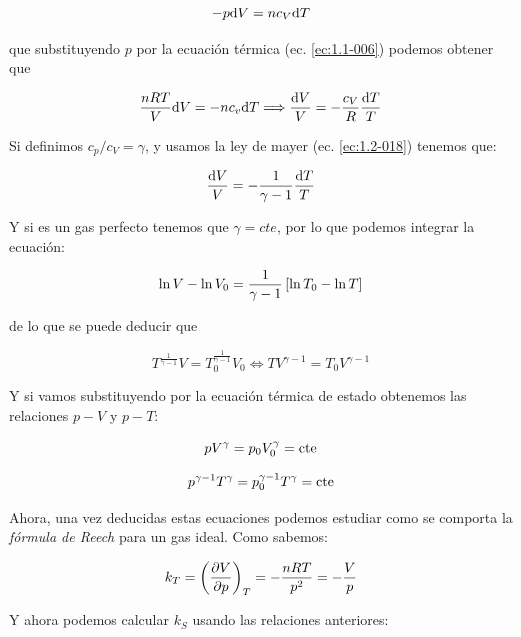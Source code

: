 \documentclass[12pt,a4paper]{article}
\begin{document}
\begin{equation}
- p \mathrm{d} V = n c_V \mathrm{d} T
\end{equation}

que substituyendo $p$ por la ecuación térmica (ec. \ref{ec:1.1-006}) podemos obtener que

\begin{equation}
\dfrac{nRT}{V} \mathrm{d} V = - n c_v  \mathrm{d} T \Longrightarrow \dfrac{\mathrm{d} V}{V} = - \dfrac{c_V}{R} \dfrac{\mathrm{d} T}{T}
\end{equation}

Si definimos $c_p/c_V = \gamma$, y usamos la ley de mayer (ec. \ref{ec:1.2-018}) tenemos que:

\begin{equation}
\dfrac{\mathrm{d} V}{V} = - \dfrac{1}{\gamma -1} \dfrac{\mathrm{d} T}{T}
\end{equation}

Y si es un gas perfecto tenemos que $\gamma = cte$, por lo que podemos integrar la ecuación:

\begin{equation}
\ln V - \ln V_0 = \dfrac{1}{\gamma - 1} \left[ \ln T_0 - \ln T \right]
\end{equation}


de lo que se puede deducir que

\begin{equation}
T^{\frac{1}{\gamma -1}} V = T_0^{\frac{1}{\gamma -1}} V_0 \Longleftrightarrow T V^{\gamma -1} = T_0 V^{\gamma-1}
\label{ec:1.3-027}
\end{equation}


Y si vamos substituyendo por la ecuación térmica de estado obtenemos las relaciones $p-V$ y $p-T$:

\begin{equation}
p V^{\gamma} = p_0 V_0^{\gamma} = \mathrm{cte}
\end{equation}

\begin{equation}
p^{\gamma - 1}T^{\gamma} = p_0^{\gamma -1} T^{\gamma} = \mathrm{cte}
\end{equation}

Ahora, una vez deducidas estas ecuaciones podemos estudiar como se comporta la \textit{fórmula de Reech} para un gas ideal. Como sabemos:

\begin{equation}
k_T = \left( \frac{\partial V}{\partial p} \right)_T = -  \dfrac{nRT}{p^2} = - \dfrac{V}{p}
\end{equation}

Y ahora podemos calcular $k_S$ usando las relaciones anteriores:
\end{document}
